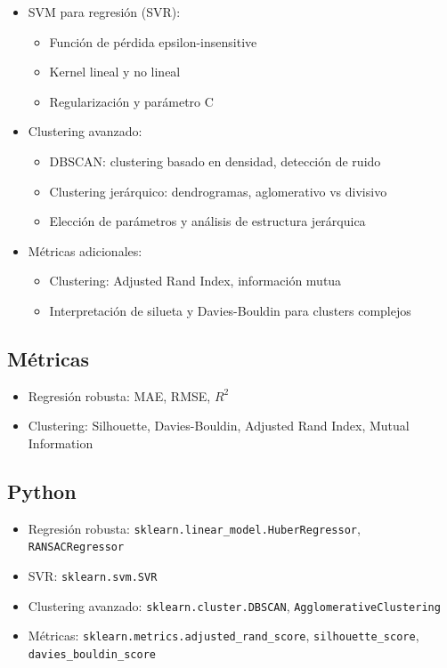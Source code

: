 \documentclass[12pt,a4paper,openany,oneside]{book}
\begin{document}
\begin{itemize}
\begin{itemize}
    \item SVM para regresión (SVR):
    \begin{itemize}
        \item Función de pérdida epsilon-insensitive
        \item Kernel lineal y no lineal
        \item Regularización y parámetro C
    \end{itemize}

    \item Clustering avanzado:
    \begin{itemize}
        \item DBSCAN: clustering basado en densidad, detección de ruido
        \item Clustering jerárquico: dendrogramas, aglomerativo vs divisivo
        \item Elección de parámetros y análisis de estructura jerárquica
    \end{itemize}

    \item Métricas adicionales:
    \begin{itemize}
        \item Clustering: Adjusted Rand Index, información mutua
        \item Interpretación de silueta y Davies-Bouldin para clusters complejos
    \end{itemize}
\end{itemize}



\subsection{Métricas}
\begin{itemize}
    \item Regresión robusta: MAE, RMSE, $R^2$
    \item Clustering: Silhouette, Davies-Bouldin, Adjusted Rand Index, Mutual Information
\end{itemize}

\subsection{Python}
\begin{itemize}
    \item Regresión robusta: \texttt{sklearn.linear\_model.HuberRegressor}, \texttt{RANSACRegressor}
    \item SVR: \texttt{sklearn.svm.SVR}
    \item Clustering avanzado: \texttt{sklearn.cluster.DBSCAN}, \texttt{AgglomerativeClustering}
    \item Métricas: \texttt{sklearn.metrics.adjusted\_rand\_score}, \texttt{silhouette\_score}, \texttt{davies\_bouldin\_score}
\end{itemize}


\end{itemize}
\end{document}
